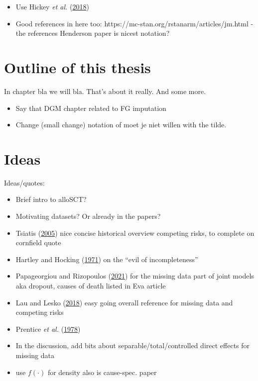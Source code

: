\documentclass[
  letterpaper,
  DIV=11,
  numbers=noendperiod]{scrreprt}
\providecommand{\tightlist}{%
  \setlength{\itemsep}{0pt}\setlength{\parskip}{0pt}}\usepackage{longtable,booktabs,array}
\begin{document}
\begin{itemize}
\tightlist
\item
  Use Hickey \emph{et al.}
  (\protect\hyperlink{ref-hickeyComparisonJointModels2018a}{2018})
\item
  Good references in here too:
  https://mc-stan.org/rstanarm/articles/jm.html - the references
  Henderson paper is nicest notation?
\end{itemize}

\hypertarget{sec-intro-outline}{%
\section{Outline of this thesis}\label{sec-intro-outline}}

In chapter bla we will bla. That's about it really. And some more.

\begin{itemize}
\tightlist
\item
  Say that DGM chapter related to FG imputation
\item
  Change (small change) notation of moet je niet willen with the tilde.
\end{itemize}

\hypertarget{ideas}{%
\section*{Ideas}\label{ideas}}


Ideas/quotes:

\begin{itemize}
\item
  Brief intro to alloSCT?
\item
  Motivating datasets? Or already in the papers?
\item
  Tsiatis (\protect\hyperlink{ref-tsiatis2005encycl}{2005}) nice concise
  historical overview competing risks, to complete on cornfield quote
\item
  Hartley and Hocking
  (\protect\hyperlink{ref-hartleyAnalysisIncompleteData1971}{1971}) on
  the ``evil of incompleteness''
\item
  Papageorgiou and Rizopoulos
  (\protect\hyperlink{ref-papageorgiouAlternativeCharacterizationMAR2021}{2021})
  for the missing data part of joint models aka dropout, causes of death
  listed in Eva article
\item
  Lau and Lesko
  (\protect\hyperlink{ref-lauMissingnessSettingCompeting2018}{2018})
  easy going overall reference for missing data and competing risks
\item
  Prentice \emph{et al.}
  (\protect\hyperlink{ref-prenticeAnalysisFailureTimes1978}{1978})
\item
  In the discussion, add bits about separable/total/controlled direct
  effects for missing data
\item
  use \(f(\cdot)\) for density also is cause-spec. paper
\end{itemize}
\end{document}
